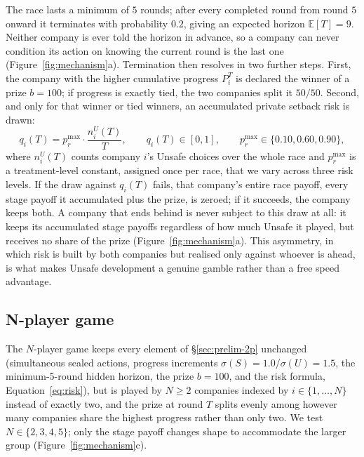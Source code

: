 \documentclass[sigconf,anonymous]{aamas}
\begin{document}
The race lasts a minimum of $5$ rounds; after every completed round from round $5$ onward it terminates with probability $0.2$, giving an expected horizon $\mathbb{E}[T]=9$. Neither company is ever told the horizon in advance, so a company can never condition its action on knowing the current round is the last one (Figure~\ref{fig:mechanism}a). Termination then resolves in two further steps. First, the company with the higher cumulative progress $P_i^T$ is declared the winner of a prize $b=100$; if progress is exactly tied, the two companies split it $50/50$. Second, and only for that winner or tied winners, an accumulated private setback risk is drawn:
\begin{equation}
    q_i(T) = p_r^{\max} \cdot \frac{n_i^U(T)}{T}, \qquad q_i(T) \in [0,1], \qquad p_r^{\max}\in\{0.10,0.60,0.90\},
    \label{eq:risk}
\end{equation}
where $n_i^U(T)$ counts company $i$'s Unsafe choices over the whole race and $p_r^{\max}$ is a treatment-level constant, assigned once per race, that we vary across three risk levels. If the draw against $q_i(T)$ fails, that company's entire race payoff, every stage payoff it accumulated plus the prize, is zeroed; if it succeeds, the company keeps both. A company that ends behind is never subject to this draw at all: it keeps its accumulated stage payoffs regardless of how much Unsafe it played, but receives no share of the prize (Figure~\ref{fig:mechanism}a). This asymmetry, in which risk is built by both companies but realised only against whoever is ahead, is what makes Unsafe development a genuine gamble rather than a free speed advantage.

\subsection{N-player game}
\label{sec:prelim-np}

The $N$-player game keeps every element of \S\ref{sec:prelim-2p} unchanged (simultaneous sealed actions, progress increments $\sigma(S)=1.0$/$\sigma(U)=1.5$, the minimum-5-round hidden horizon, the prize $b=100$, and the risk formula, Equation~\ref{eq:risk}), but is played by $N\geq2$ companies indexed by $i\in\{1,\dots,N\}$ instead of exactly two, and the prize at round $T$ splits evenly among however many companies share the highest progress rather than only two. We test $N\in\{2,3,4,5\}$; only the stage payoff changes shape to accommodate the larger group (Figure~\ref{fig:mechanism}c).
\end{document}

